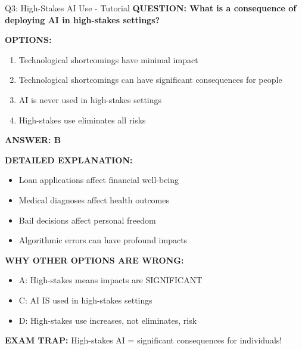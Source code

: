 \documentclass[8pt]{beamer}
\begin{document}
	\begin{frame}{Q3: High-Stakes AI Use - Tutorial}
		\fontsize{6.5}{7.5}\selectfont
		\textbf{QUESTION: What is a consequence of deploying AI in high-stakes settings?}
		
		\vspace{0.1cm}
		\textbf{OPTIONS:}
		\begin{enumerate}
			\item Technological shortcomings have minimal impact
			\item Technological shortcomings can have significant consequences for people
			\item AI is never used in high-stakes settings
			\item High-stakes use eliminates all risks
		\end{enumerate}
		
		\vspace{0.1cm}
		\textcolor{myblue}{\textbf{ANSWER: B}}
		
		\vspace{0.1cm}
		\textbf{DETAILED EXPLANATION:}
		\begin{itemize}
			\item Loan applications affect financial well-being
			\item Medical diagnoses affect health outcomes
			\item Bail decisions affect personal freedom
			\item Algorithmic errors can have profound impacts
		\end{itemize}
		
		\vspace{0.1cm}
		\textcolor{myred}{\textbf{WHY OTHER OPTIONS ARE WRONG:}}
		\begin{itemize}
			\item \textcolor{myred}{A:} High-stakes means impacts are SIGNIFICANT
			\item \textcolor{myred}{C:} AI IS used in high-stakes settings
			\item \textcolor{myred}{D:} High-stakes use increases, not eliminates, risk
		\end{itemize}
		
		\textcolor{myred}{\textbf{EXAM TRAP:}} High-stakes AI = \textcolor{myblue}{significant consequences} for individuals!
	\end{frame}
	
\end{document}
